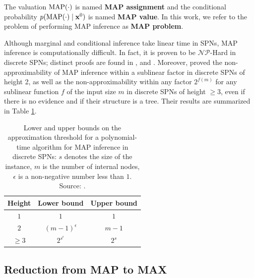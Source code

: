 The valuation $\operatorname*{MAP}(\cdot)$ is named \textbf{MAP assignment} and the conditional probability $p(\operatorname*{MAP}(\cdot) \mid \mathbf{x}^0)$ is named \textbf{MAP value}. In this work, we refer to the problem of performing MAP inference as \textbf{MAP problem}.

\vspace{1em}

Although marginal and conditional inference take linear time in SPNs, MAP inference is computationally difficult. In fact, it is proven to be $\mathcal{NP}$-Hard in discrete SPNs; distinct proofs are found in \citep{Peharz2015}, \citep{Peharz2016} and \citep{Conaty2017}. Moreover, \citet{Conaty2017} proved the non-approximability of MAP inference within a sublinear factor in discrete SPNs of height 2, as well as the non-approximability within any factor $2^{f(m)}$ for any sublinear function $f$ of the input size $m$ in discrete SPNs of height $\geq 3$, even if there is no evidence and if their structure is a tree. Their results are summarized in Table \ref{tab:mapcomplexity}.

\begin{table}
  \centering

  \begin{tabular}{ccc}
    \toprule
    \bfseries Height & \bfseries Lower bound & \bfseries Upper bound \\ \midrule
    $1$              & $1$                   & $1$                   \\
    $2$              & $(m-1)^\epsilon$      & $m-1$                 \\
    $\geq 3$         & $2^{s^\epsilon}$      & $2^s$                 \\
    \bottomrule
  \end{tabular}

  \caption[Lower and upper bounds on the approximation threshold for a polynomial-time algorithm for MAP inference in discrete SPNs]{Lower and upper bounds on the approximation threshold for a polynomial-time algorithm for MAP inference in discrete SPNs: $s$ denotes the size of the instance, $m$ is the number of internal nodes, $\epsilon$ is a non-negative number less than $1$. Source: \citet{Conaty2017}.}
  \label{tab:mapcomplexity}
\end{table}

\subsection{Reduction from MAP to MAX}
\vspace{1em}

